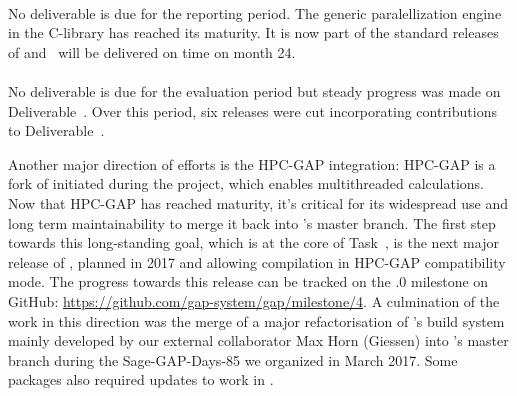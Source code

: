 \documentclass{deliverablereport}
\begin{document}
\paragraph{}

No deliverable is due for the reporting period.
The generic paralellization engine in the \Pari C-library
has reached its maturity. It is now part of the standard releases of \Pari
and~
will be delivered on time on month 24.

\paragraph{}

No deliverable is due for the evaluation period but steady progress was made on
Deliverable~. Over this period, six releases were cut
incorporating contributions to Deliverable~.

Another major direction of efforts is the HPC-GAP integration:
HPC-GAP is a fork of \GAP initiated during the \scienceproject project, which
enables multithreaded calculations. Now that HPC-GAP has reached
maturity, it's critical for its widespread use and long term
maintainability to merge it back into \GAP's master branch.
The first step towards this long-standing goal, which is at the core of
Task~, is the next
major release of , planned in 2017 and allowing compilation in HPC-GAP
compatibility mode. The progress towards this release can be tracked on the .0 milestone on GitHub: \url{https://github.com/gap-system/gap/milestone/4}.
A culmination of the work in this direction was the merge of a major
refactorisation of \GAP's build system
mainly developed by our external collaborator Max Horn (Giessen) into \GAP's master
branch during the Sage-GAP-Days-85 we organized in March 2017. Some
\GAP packages also required updates to work in .

\paragraph{}
\end{document}
